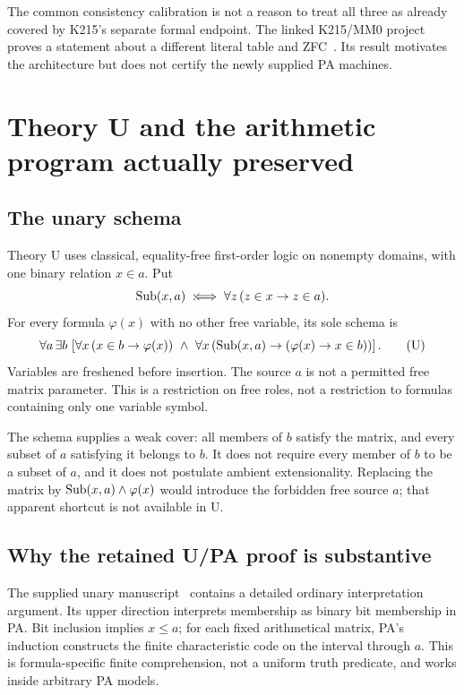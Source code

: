The common consistency calibration is not a reason to treat all three as
already covered by K215's separate formal endpoint. The linked
K215/MM0 project proves a statement about a different literal table and
ZFC~\cite{k215pa}. Its result motivates the architecture but does not certify
the newly supplied PA machines.

\section{Theory U and the arithmetic program actually preserved}\label{sec:theory}

\subsection{The unary schema}
Theory U uses classical, equality-free first-order logic on nonempty domains,
with one binary relation \(x\in a\). Put
\[
 \operatorname{Sub}(x,a)\;:\!\Longleftrightarrow\;\forall z\,(z\in x\to z\in a).
\]
For every formula \(\varphi(x)\) with no other free variable, its sole schema is
\[
 \forall a\,\exists b\,
 \left[
   \forall x\,(x\in b\to\varphi(x))
   \ \land\
   \forall x\,(\operatorname{Sub}(x,a)\to(\varphi(x)\to x\in b))
 \right].
 \tag{U}
\]
Variables are freshened before insertion. The source \(a\) is not a permitted
free matrix parameter. This is a restriction on free roles, not a restriction
to formulas containing only one variable symbol.

The schema supplies a weak cover: all members of \(b\) satisfy the matrix, and
every subset of \(a\) satisfying it belongs to \(b\). It does not require every
member of \(b\) to be a subset of \(a\), and it does not postulate ambient
extensionality. Replacing the matrix by
\(\operatorname{Sub}(x,a)\land\varphi(x)\) would introduce the forbidden free source \(a\);
that apparent shortcut is not available in U.

\subsection{Why the retained U/PA proof is substantive}
The supplied unary manuscript~\cite{unary} contains a detailed ordinary
interpretation argument. Its upper direction interprets membership as binary
bit membership in PA. Bit inclusion implies \(x\le a\); for each fixed
arithmetical matrix, PA's induction constructs the finite characteristic code
on the interval through \(a\). This is formula-specific finite comprehension,
not a uniform truth predicate, and works inside arbitrary PA models.

